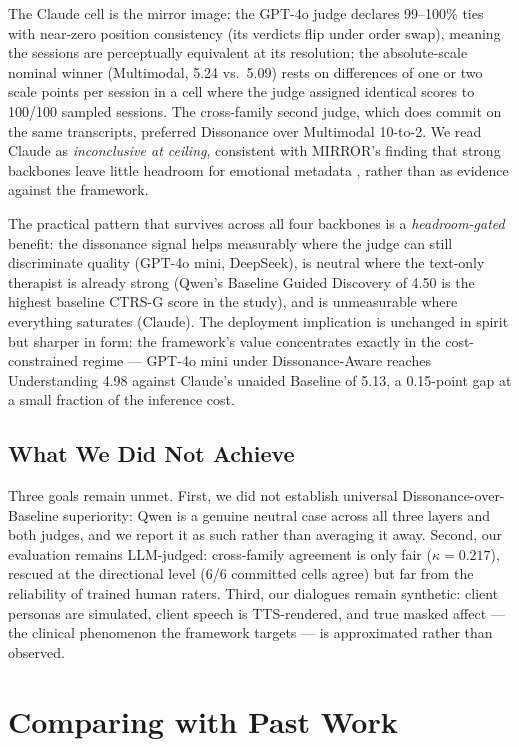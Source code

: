 The Claude cell is the mirror image: the GPT-4o judge declares 99--100\% ties with near-zero position consistency (its verdicts flip under order swap), meaning the sessions are perceptually equivalent at its resolution; the absolute-scale nominal winner (Multimodal, 5.24 vs.\ 5.09) rests on differences of one or two scale points per session in a cell where the judge assigned identical scores to 100/100 sampled sessions. The cross-family second judge, which does commit on the same transcripts, preferred Dissonance over Multimodal 10-to-2. We read Claude as \emph{inconclusive at ceiling}, consistent with MIRROR's finding that strong backbones leave little headroom for emotional metadata \cite{kim-etal-2025-mirror}, rather than as evidence against the framework.

The practical pattern that survives across all four backbones is a \emph{headroom-gated} benefit: the dissonance signal helps measurably where the judge can still discriminate quality (GPT-4o mini, DeepSeek), is neutral where the text-only therapist is already strong (Qwen's Baseline Guided Discovery of 4.50 is the highest baseline CTRS-G score in the study), and is unmeasurable where everything saturates (Claude). The deployment implication is unchanged in spirit but sharper in form: the framework's value concentrates exactly in the cost-constrained regime --- GPT-4o mini under Dissonance-Aware reaches Understanding 4.98 against Claude's unaided Baseline of 5.13, a 0.15-point gap at a small fraction of the inference cost.

\subsection{What We Did Not Achieve}

Three goals remain unmet. First, we did not establish universal Dissonance-over-Baseline superiority: Qwen is a genuine neutral case across all three layers and both judges, and we report it as such rather than averaging it away. Second, our evaluation remains LLM-judged: cross-family agreement is only fair ($\kappa = 0.217$), rescued at the directional level (6/6 committed cells agree) but far from the reliability of trained human raters. Third, our dialogues remain synthetic: client personas are simulated, client speech is TTS-rendered, and true masked affect --- the clinical phenomenon the framework targets --- is approximated rather than observed.

\section{Comparing with Past Work}

